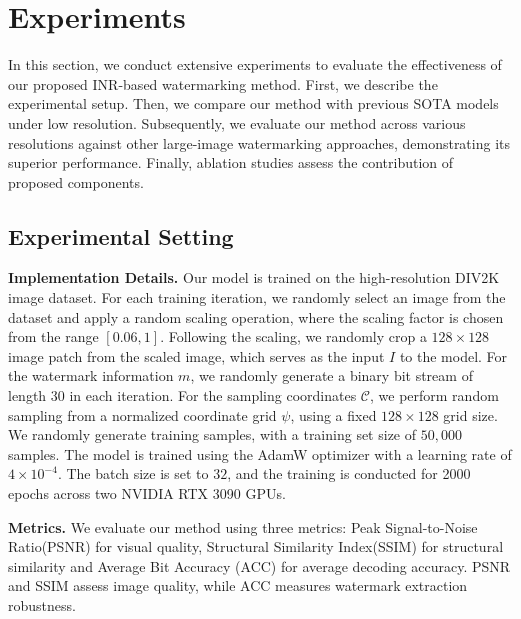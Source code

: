 \documentclass{article}
\begin{document}
\section{Experiments} \label{experiments}

In this section, we conduct extensive experiments to evaluate the effectiveness of our proposed INR-based watermarking method. 
First, we describe the experimental setup. Then, we compare our method with previous SOTA models under low resolution. Subsequently, we evaluate our method across various resolutions against other large-image watermarking approaches, demonstrating its superior performance. Finally, ablation studies assess the contribution of proposed components.
\subsection{Experimental Setting} \label{setting}
\textbf{Implementation Details.} Our model is trained on the high-resolution DIV2K \cite{agustsson2017ntire} image dataset. For each training iteration, we randomly select an image from the dataset and apply a random scaling operation, where the scaling factor is chosen from the range $[0.06, 1]$. Following the scaling, we randomly crop a $128 \times 128$ image patch from the scaled image, which serves as the input $I$ to the model. For the watermark information $m$, we randomly generate a binary bit stream of length $30$ in each iteration. For the sampling coordinates $\mathcal{C}$, we perform random sampling from a normalized coordinate grid $\psi$, using a fixed $128 \times 128$ grid size.
We randomly generate training samples, with a training set size of $50,000$ samples. The model is trained using the AdamW \cite{loshchilov2017decoupled} optimizer with a learning rate of \(4 \times 10^{-4}\). The batch size is set to $32$, and the training is conducted for 2000 epochs across two NVIDIA RTX 3090 GPUs.

\textbf{Metrics.} We evaluate our method using three metrics: Peak Signal-to-Noise Ratio(PSNR) for visual quality, Structural Similarity Index(SSIM) for structural similarity and Average Bit Accuracy (ACC) for average  decoding accuracy. PSNR and SSIM assess image quality, while ACC measures watermark extraction robustness.
\end{document}
